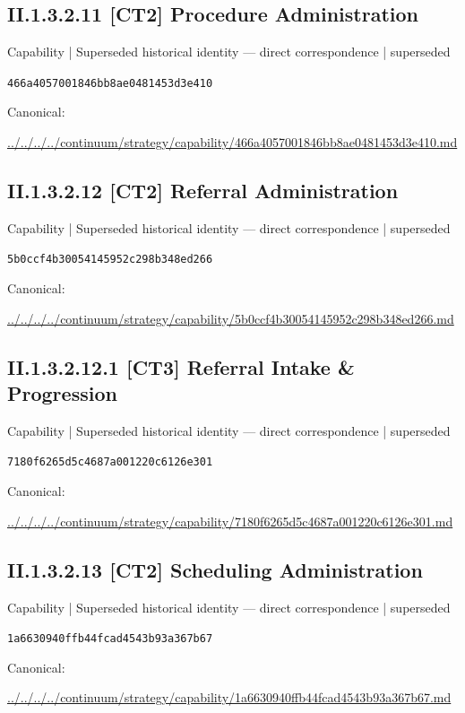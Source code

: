 \documentclass[10pt,a4paper]{article}
\begin{document}
\subsection*{II.1.3.2.11 [CT2] Procedure Administration}
{\small Capability | Superseded historical identity — direct correspondence | superseded}\par
\texttt{466a4057001846bb8ae0481453d3e410}\par
Canonical: \par
{\footnotesize\url{../../../../continuum/strategy/capability/466a4057001846bb8ae0481453d3e410.md}}\par
\subsection*{II.1.3.2.12 [CT2] Referral Administration}
{\small Capability | Superseded historical identity — direct correspondence | superseded}\par
\texttt{5b0ccf4b30054145952c298b348ed266}\par
Canonical: \par
{\footnotesize\url{../../../../continuum/strategy/capability/5b0ccf4b30054145952c298b348ed266.md}}\par
\subsection*{II.1.3.2.12.1 [CT3] Referral Intake \& Progression}
{\small Capability | Superseded historical identity — direct correspondence | superseded}\par
\texttt{7180f6265d5c4687a001220c6126e301}\par
Canonical: \par
{\footnotesize\url{../../../../continuum/strategy/capability/7180f6265d5c4687a001220c6126e301.md}}\par
\subsection*{II.1.3.2.13 [CT2] Scheduling Administration}
{\small Capability | Superseded historical identity — direct correspondence | superseded}\par
\texttt{1a6630940ffb44fcad4543b93a367b67}\par
Canonical: \par
{\footnotesize\url{../../../../continuum/strategy/capability/1a6630940ffb44fcad4543b93a367b67.md}}\par
\end{document}
